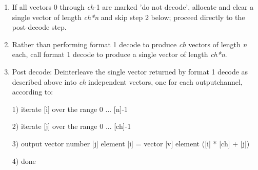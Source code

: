 \begin{enumerate}
 \item If all vectors 0 through \emph{ch}-1 are marked 'do not decode', allocate and clear a single vector \varname{[v]}of length \emph{ch*n} and skip step 2 below; proceed directly to the post-decode step.
 \item Rather than performing format 1 decode to produce \emph{ch} vectors of length \emph{n} each, call format 1 decode to produce a single vector \varname{[v]} of length \emph{ch*n}.
 \item Post decode: Deinterleave the single vector \varname{[v]} returned by format 1 decode as described above into \emph{ch} independent vectors, one for each outputchannel, according to:
  \begin{programlisting}
  1) iterate [i] over the range 0 ... [n]-1 {

       2) iterate [j] over the range 0 ... [ch]-1 {

            3) output vector number [j] element [i] = vector [v] element ([i] * [ch] + [j])

          }
     }

  4) done
  \end{programlisting}

\end{enumerate}







